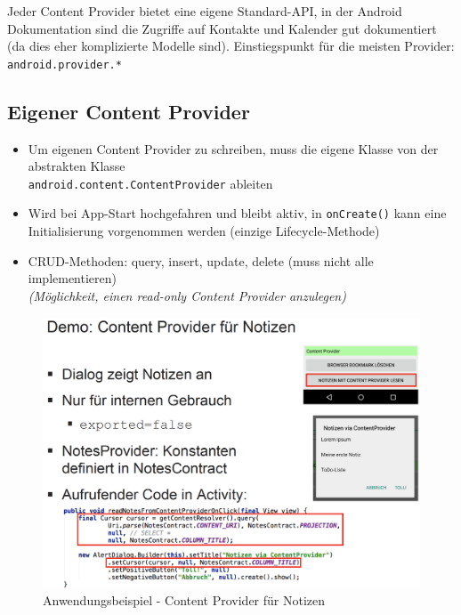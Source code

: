 \documentclass[a4paper]{article}
\begin{document}
Jeder Content Provider bietet eine eigene Standard-API, in der Android Dokumentation sind die Zugriffe auf Kontakte und Kalender gut dokumentiert (da dies eher komplizierte Modelle sind). Einstiegspunkt für die meisten Provider: \texttt{android.provider.*}

\subsection{Eigener Content Provider}

\begin{itemize}
	\item Um eigenen Content Provider zu schreiben, muss die eigene Klasse von der abstrakten Klasse\\ \texttt{android.content.ContentProvider} ableiten
	\item Wird bei App-Start hochgefahren und bleibt aktiv, in \texttt{onCreate()} kann eine Initialisierung vorgenommen werden (einzige Lifecycle-Methode)
	\item CRUD-Methoden: query, insert, update, delete (muss nicht alle implementieren)\\
	\textit{(Möglichkeit, einen read-only Content Provider anzulegen)}
\end{itemize}

\begin{figure}[htb!]
	\centering
	\includegraphics[width=.75\textwidth]{img/content_notes.png}
	\caption{Anwendungsbeispiel - Content Provider für Notizen}
\end{figure}
\end{document}
